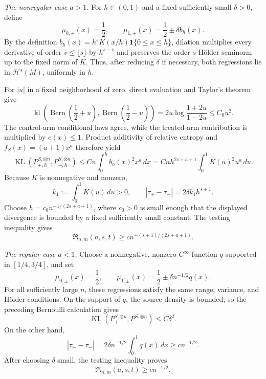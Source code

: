 \emph{The nonregular case \(a>1\).}
For \(h\in(0,1)\) and a fixed sufficiently small \(\delta>0\), define
\[
 \mu_{0,\pm}(x)=\frac12,
 \qquad
 \mu_{1,\pm}(x)=\frac12\pm\delta b_h(x).
\]
By the definition \(b_h(x)=h^sK(x/h)\mathbf 1\{0\le x\le h\}\), dilation multiplies every derivative of order \(v\le\lfloor s\rfloor\) by \(h^{s-v}\) and preserves the order-\(s\) Hölder seminorm up to the fixed norm of \(K\).  Thus, after reducing \(\delta\) if necessary, both regressions lie in \(\mathcal H^s(M)\), uniformly in \(h\).

For \(|u|\) in a fixed neighborhood of zero, direct evaluation and Taylor's theorem give
\[
 \operatorname{kl}\!\left(
  \operatorname{Bern}\left(\frac12+u\right),
  \operatorname{Bern}\left(\frac12-u\right)
 \right)
 =2u\log\frac{1+2u}{1-2u}
 \le C_0u^2.
\]
The control-arm conditional laws agree, while the treated-arm contribution is multiplied by \(e(x)\le1\).  Product additivity of relative entropy and \(f_S(x)=(a+1)x^a\) therefore yield
\[
 \operatorname{KL}(P_{+,h}^{S,\otimes n},P_{-,h}^{S,\otimes n})
 \le Cn\int_0^h b_h(x)^2x^a\,dx
 =Cnh^{2s+a+1}\int_0^1K(u)^2u^a\,du.
\]
Because \(K\) is nonnegative and nonzero,
\[
 k_1:=\int_0^1K(u)\,du>0,
 \qquad
 |\tau_+-\tau_-|=2\delta k_1h^{s+1}.
\]
Choose \(h=c_0n^{-1/(2s+a+1)}\), where \(c_0>0\) is small enough that the displayed divergence is bounded by a fixed sufficiently small constant.  The testing inequality gives
\[
 \mathfrak R_{n,m}(a,s,t)
 \ge c n^{-(s+1)/(2s+a+1)}.
\]

\emph{The regular case \(a<1\).}
Choose a nonnegative, nonzero \(C^\infty\) function \(q\) supported in \([1/4,3/4]\), and set
\[
 \mu_{0,\pm}(x)=\frac12,
 \qquad
 \mu_{1,\pm}(x)=\frac12\pm\delta n^{-1/2}q(x).
\]
For all sufficiently large \(n\), these regressions satisfy the same range, variance, and Hölder conditions.  On the support of \(q\), the source density is bounded, so the preceding Bernoulli calculation gives
\[
 \operatorname{KL}(P_+^{S,\otimes n},P_-^{S,\otimes n})
 \le C\delta^2.
\]
On the other hand,
\[
 |\tau_+-\tau_-|
 =2\delta n^{-1/2}\int_0^1q(x)\,dx
 \ge c n^{-1/2}.
\]
After choosing \(\delta\) small, the testing inequality proves
\[
 \mathfrak R_{n,m}(a,s,t)\ge c n^{-1/2}.
\]

